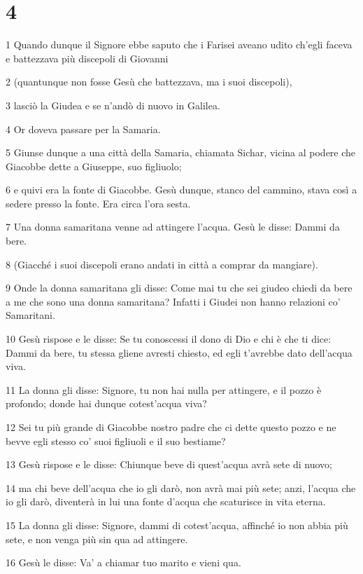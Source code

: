 \chapter{4}

\par 1 Quando dunque il Signore ebbe saputo che i Farisei aveano udito ch'egli faceva e battezzava più discepoli di Giovanni
\par 2 (quantunque non fosse Gesù che battezzava, ma i suoi discepoli),
\par 3 lasciò la Giudea e se n'andò di nuovo in Galilea.
\par 4 Or doveva passare per la Samaria.
\par 5 Giunse dunque a una città della Samaria, chiamata Sichar, vicina al podere che Giacobbe dette a Giuseppe, suo figliuolo;
\par 6 e quivi era la fonte di Giacobbe. Gesù dunque, stanco del cammino, stava così a sedere presso la fonte. Era circa l'ora sesta.
\par 7 Una donna samaritana venne ad attingere l'acqua. Gesù le disse: Dammi da bere.
\par 8 (Giacché i suoi discepoli erano andati in città a comprar da mangiare).
\par 9 Onde la donna samaritana gli disse: Come mai tu che sei giudeo chiedi da bere a me che sono una donna samaritana? Infatti i Giudei non hanno relazioni co' Samaritani.
\par 10 Gesù rispose e le disse: Se tu conoscessi il dono di Dio e chi è che ti dice: Dammi da bere, tu stessa gliene avresti chiesto, ed egli t'avrebbe dato dell'acqua viva.
\par 11 La donna gli disse: Signore, tu non hai nulla per attingere, e il pozzo è profondo; donde hai dunque cotest'acqua viva?
\par 12 Sei tu più grande di Giacobbe nostro padre che ci dette questo pozzo e ne bevve egli stesso co' suoi figliuoli e il suo bestiame?
\par 13 Gesù rispose e le disse: Chiunque beve di quest'acqua avrà sete di nuovo;
\par 14 ma chi beve dell'acqua che io gli darò, non avrà mai più sete; anzi, l'acqua che io gli darò, diventerà in lui una fonte d'acqua che scaturisce in vita eterna.
\par 15 La donna gli disse: Signore, dammi di cotest'acqua, affinché io non abbia più sete, e non venga più sin qua ad attingere.
\par 16 Gesù le disse: Va' a chiamar tuo marito e vieni qua.
